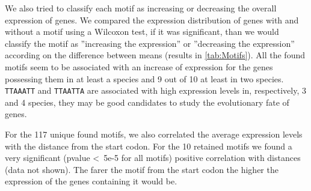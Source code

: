We also tried to classify each motif as increasing or decreasing the overall expression of genes. We compared the expression distribution of genes with and without a motif using a Wilcoxon test, if it was significant, than we would classify the motif as ''increasing the expression'' or ''decreasing the expression'' according on the difference between means (results in \autoref{tab:Motifs}). All the found motifs seem to be associated with an increase of expression for the genes possessing them in at least a species and 9 out of 10 at least in two species. \texttt{TTAAATT} and \texttt{TTAATTA} are associated with high expression levels in, respectively, 3 and 4 species, they may be good candidates to study the evolutionary fate of genes.

For the 117 unique found motifs, we also correlated the average expression levels with the distance from the start codon. For the 10 retained motifs we found a very significant (pvalue \textless~5e-5 for all motifs) positive correlation with distances (data not shown). The farer the motif from the start codon the higher the expression of the genes containing it would be.